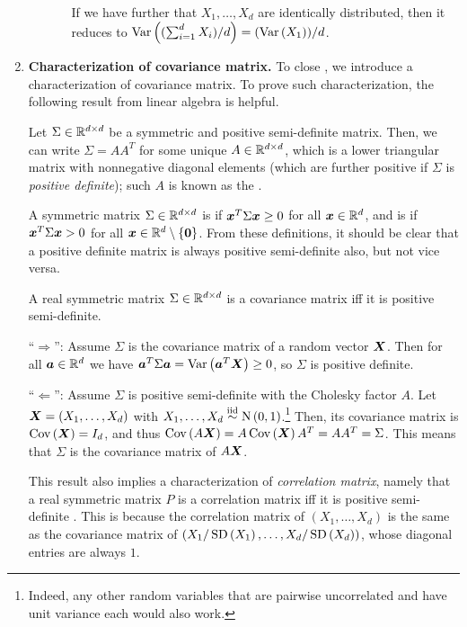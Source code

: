 \begin{enumerate}
\begin{enumerate}
\begin{enumerate}
If we have further that \(X_1,\dotsc,X_d\) are identically distributed, then
it reduces to \(\operatorname{Var}\left((\sum_{i=1}^{d}X_i)/d\right)=(\operatorname{Var}\left(X_1\right))/d\).
\end{enumerate}
\end{enumerate}
\item \textbf{Characterization of covariance matrix.} To close
, we introduce a characterization of
covariance matrix. To prove such characterization, the following result from
linear algebra is helpful.
\begin{lemma}
\label{lma:cholesky-decomp}
Let \(\Sigma\in\mathbb{R}^{d\times d}\) be a symmetric and positive semi-definite
matrix.  Then, we can write \(\Sigma=AA^{T}\) for some unique \(A\in\mathbb{R}^{d\times
d}\), which is a lower triangular matrix with nonnegative diagonal elements
(which are further positive if \(\Sigma\) is \emph{positive definite}); such
\(A\) is known as the .
\end{lemma}
\begin{note}
A symmetric matrix \(\Sigma\in\mathbb{R}^{d\times d}\) is 
if \(\bm{x}^{T}\Sigma\bm{x}\ge 0\) for all \(\bm{x}\in\mathbb{R}^d\), and is
 if \(\bm{x}^{T}\Sigma\bm{x}>0\) for all
\(\bm{x}\in\mathbb{R}^d\setminus \{\bm{0}\}\). From these definitions, it should be
clear that a positive definite matrix is always positive semi-definite also,
but not vice versa.
\end{note}
\begin{proposition}
\label{prp:cov-matx-char}
A real symmetric matrix \(\Sigma\in\mathbb{R}^{d\times d}\) is a covariance matrix iff
it is positive semi-definite.
\end{proposition}
\begin{pf}
``\(\Rightarrow\)'': Assume \(\Sigma\) is the covariance matrix of a random
vector \(\bm{X}\). Then for all \(\bm{a}\in\mathbb{R}^d\) we have
\(\bm{a}^{T}\Sigma\bm{a}=\operatorname{Var}\left(\bm{a}^{T}\bm{X}\right)\ge 0\), so \(\Sigma\)
is positive definite.

``\(\Leftarrow\)'': Assume \(\Sigma\) is positive semi-definite with the
Cholesky factor \(A\). Let \(\bm{X}=(X_1,\dotsc,X_d)\) with
\(X_1,\dotsc,X_d\overset{\text{iid}}\sim\operatorname{N}\left(0,1\right)\).\footnote{Indeed, any other random variables
that are pairwise uncorrelated and have unit variance each would also work.} Then,
its covariance matrix is \(\operatorname{Cov}\left(\bm{X}\right)=I_d\), and thus
\(\operatorname{Cov}\left(A\bm{X}\right)=A\operatorname{Cov}\left(\bm{X}\right)A^{T}=AA^{T}=\Sigma\). This means that
\(\Sigma\) is the covariance matrix of \(A\bm{X}\).
\end{pf}

\begin{note}
This result also implies a characterization of \emph{correlation matrix},
namely that a real symmetric matrix \(P\) is a correlation matrix iff it is
positive semi-definite . This is
because the correlation matrix of \((X_1,\dotsc,X_d)\) is the same as the
covariance matrix of \((X_1/\operatorname{SD}\left(X_1\right),\dotsc,X_d/\operatorname{SD}\left(X_d\right))\), whose diagonal
entries are always \(1\).
\end{note}
\end{enumerate}
